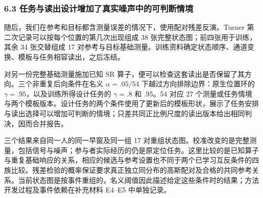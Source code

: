 \documentclass[11pt,a4paper]{article}
\begin{document}
\subsubsection{6.3
任务与读出设计增加了真实噪声中的可判断情境}\label{ux4efbux52a1ux4e0eux8bfbux51faux8bbeux8ba1ux589eux52a0ux4e86ux771fux5b9eux566aux58f0ux4e2dux7684ux53efux5224ux65adux60c5ux5883}

随后，我们在参考和目标都含测量误差的情况下，使用配对残差反演。Turner
第二次记录可以按每个位置的第几次出现组成 38
张完整状态图；前四张用于训练，其余 34 张交替组成 17
对参考与目标基础测量。训练资料确定状态顺序、通道变换、模板与任务相容读出，之后冻结。

对另一份完整基础测量施加已知 SR
算子，便可以检查这套读出是否保留了其方向。三个非重复后向条件在名义
\(\alpha=.05/54\) 下越过方向排除边界：原生位置环的
\(\gamma=.95\)，以及训练所得设计任务的 \(\gamma=.8\) 和 \(.95\)。54 对应
27
个测量或任务情境与两个模板版本。设计任务的两个条件使用了更新后的模板形状，展示了任务安排与读出选择可以增加可判断的情境；只差共同正比例尺度的读出版本给出相同判决，因而合并报告。

三个结果来自同一人的同一早窗及同一组 17
对重组状态图。校准改变的是完整测量，包括信号与噪声；参与者实际经历的仍是原定位任务。这里比较的是已知算子与重复基础响应的关系，相应的候选与参考设置也不同于两个已学习互反条件的四族比较。残差检验的概率保证要求真正独立同分布的高斯配对及合格的共同参考关系。当前状态图是按事件重组的，名义阈值因此描述给定这些条件时的结果；方法开发过程及事件依赖在补充材料
E4–E5 中单独记录。
\end{document}
